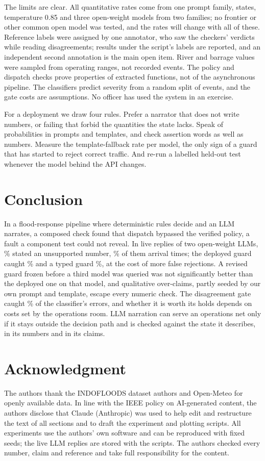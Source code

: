\documentclass[conference]{IEEEtran}
\begin{document}
The limits are clear. All quantitative rates come from one prompt family, \LiveStates{} states, temperature 0.85 and three open-weight models from two families; no frontier or other common open model was tested, and the rates will change with all of these. Reference labels were assigned by one annotator, who saw the checkers' verdicts while reading disagreements; results under the script's labels are reported, and an independent second annotation is the main open item. River and barrage values were sampled from operating ranges, not recorded events. The policy and dispatch checks prove properties of extracted functions, not of the asynchronous pipeline. The classifiers predict severity from a random split of events, and the gate costs are assumptions. No officer has used the system in an exercise.

For a deployment we draw four rules. Prefer a narrator that does not write numbers, or failing that forbid the quantities the state lacks. Speak of probabilities in prompts and templates, and check assertion words as well as numbers. Measure the template-fallback rate per model, the only sign of a guard that has started to reject correct traffic. And re-run a labelled held-out test whenever the model behind the API changes.

\section{Conclusion}
In a flood-response pipeline where deterministic rules decide and an LLM narrates, a composed check found that dispatch bypassed the verified policy, a fault a component test could not reveal. In \LiveN{} live replies of two open-weight LLMs, \LiveUnsupPct\% stated an unsupported number, \LiveEtaPct\% of them arrival times; the deployed guard caught \LiveDepRec\% and a typed guard \LiveTypRec\%, at the cost of more false rejections. \ConclusionDesign{} A revised guard frozen before a third model was queried was not significantly better than the deployed one on that model, and qualitative over-claims, partly seeded by our own prompt and template, escape every numeric check. The disagreement gate caught \GtDepRecall\% of the classifier's errors, and whether it is worth its holds depends on costs set by the operations room. LLM narration can serve an operations net only if it stays outside the decision path and is checked against the state it describes, in its numbers and in its claims.

\section*{Acknowledgment}
The authors thank the INDOFLOODS dataset authors and Open-Meteo for openly available data.
In line with the IEEE policy on AI-generated content, the authors disclose that Claude (Anthropic) was used to help edit and restructure the text of all sections and to draft the experiment and plotting scripts. All experiments use the authors' own software and can be reproduced with fixed seeds; the live LLM replies are stored with the scripts. The authors checked every number, claim and reference and take full responsibility for the content.
\end{document}

